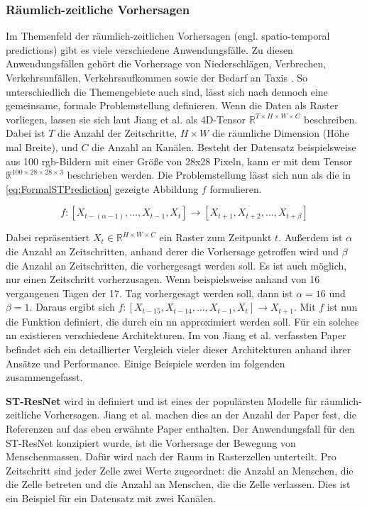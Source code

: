 \subsubsection{Räumlich-zeitliche Vorhersagen}
\label{sec:STPredictions}
Im Themenfeld der räumlich-zeitlichen Vorhersagen (engl. spatio-temporal predictions) gibt es viele verschiedene Anwendungsfälle.
Zu diesen Anwendungsfällen gehört die Vorhersage von Niederschlägen, Verbrechen, Verkehrsunfällen, Verkehrsaufkommen sowie der Bedarf an Taxis \cite{ConvLSTM,CrimeConvLSTM,CrimeSTResNet,HeteroConvLSTM,TrafficVolumeGraphDCRNN,STResNetOriginal}.
So unterschiedlich die Themengebiete auch sind, lässt sich nach \cite{DLTraff} dennoch eine gemeinsame, formale Problemstellung definieren.
Wenn die Daten als Raster vorliegen, lassen sie sich laut Jiang et al. als 4D-Tensor $\mathbb{R}^{T \times H \times W \times C}$ beschreiben.
Dabei ist $T$ die Anzahl der Zeitschritte, $H \times W$ die räumliche Dimension (Höhe mal Breite), und $C$ die Anzahl an Kanälen.
Besteht der Datensatz beispielsweise aus 100 \acrshort{rgb}-Bildern mit einer Größe von 28x28 Pixeln, kann er mit dem Tensor $\mathbb{R}^{100 \times 28 \times 28 \times 3}$ beschrieben werden.
Die Problemstellung lässt sich nun als die in \autoref{eq:FormalSTPrediction} gezeigte Abbildung $f$ formulieren.

\begin{equation}
    f: [X_{t-(\alpha-1)}, \dots, X_{t-1}, X_t] \to [X_{t+1}, X_{t+2}, \dots, X_{t+\beta}]
\label{eq:FormalSTPrediction}
\end{equation}

Dabei repräsentiert $X_t \in \mathbb{R}^{H \times W \times C}$ ein Raster zum Zeitpunkt $t$.
Außerdem ist $\alpha$ die Anzahl an Zeitschritten, anhand derer die Vorhersage getroffen wird und $\beta$ die Anzahl an Zeitschritten, die vorhergesagt werden soll.
Es ist auch möglich, nur einen Zeitschritt vorherzusagen.
Wenn beispielsweise anhand von 16 vergangenen Tagen der 17. Tag vorhergesagt werden soll, dann ist $\alpha = 16$ und $\beta = 1$.
Daraus ergibt sich $f: [X_{t-15}, X_{t-14}, \dots, X_{t-1}, X_t] \to X_{t+1}$.
Mit $f$ ist nun die Funktion definiert, die durch ein \acrshort{nn} approximiert werden soll.
Für ein solches \acrshort{nn} existieren verschiedene Architekturen.
Im von Jiang et al. verfassten Paper \cite{DLTraff} befindet sich ein detaillierter Vergleich vieler dieser Architekturen anhand ihrer Ansätze und Performance.
Einige Beispiele werden im folgenden zusammengefasst.

\textbf{ST-ResNet} wird in \cite{STResNetOriginal} definiert und ist eines der populärsten Modelle für räumlich-zeitliche Vorhersagen.
Jiang et al. machen dies an der Anzahl der Paper fest, die Referenzen auf das eben erwähnte Paper enthalten.
Der Anwendungsfall für den ST-ResNet konzipiert wurde, ist die Vorhersage der Bewegung von Menschenmassen.
Dafür wird nach der Raum in Rasterzellen unterteilt.
Pro Zeitschritt sind jeder Zelle zwei Werte zugeordnet: die Anzahl an Menschen, die die Zelle betreten und die Anzahl an Menschen, die die Zelle verlassen.
Dies ist ein Beispiel für ein Datensatz mit zwei Kanälen.
